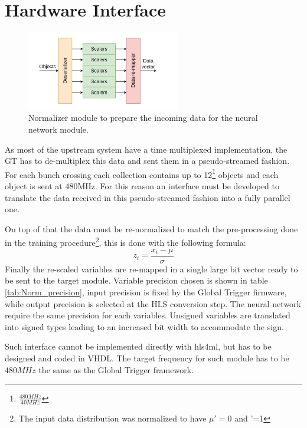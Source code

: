 \documentclass[../../main.tex]{subfiles}
\begin{document}
\section{Hardware Interface}
\label{sec:P2GT_Int}

\begin{figure}
    \centering
    \includegraphics[width=0.6\textwidth]{sections/05/Images/NN_Normalizer.pdf}
    \caption{Normalizer module to prepare the incoming data for the neural network module.}
    \label{fig:NN_norm}
    \vspace{1cm}
\end{figure}
As most of the upstream system have a time multiplexed implementation, the GT has to de-multiplex this data and sent them in a pseudo-streamed fashion. For each bunch crossing each collection contains up to 12\footnote{$\frac{480MHz}{40MHz}$} objects and each object is sent at 480MHz. For this reason an interface must be developed to translate the data received in this pseudo-streamed fashion into a fully parallel one. 

On top of that the data must be re-normalized to match the pre-processing done in the training procedure\footnote{The input data distribution was normalized to have $\mu '=0$ and \sigma '=1}, this is done with the following formula:
\begin{equation}
    z_i=\frac{x_i - \mu}{\sigma}
\end{equation}
Finally the re-scaled variables are re-mapped in a single large bit vector ready to be sent to the target module. Variable precision chosen is shown in table \ref{tab:Norm_precision}, input precision is fixed by the Global Trigger firmware, while output precision is selected at the HLS conversion step. The neural network require the same precision for each variables. Unsigned variables are translated into signed types leading to an increased bit width to accommodate the sign.  

Such interface cannot be implemented directly with hls4ml, but has to be designed and coded in VHDL. The target frequency for such module has to be 480$MHz$ the same as the Global Trigger framework.  
\end{document}
